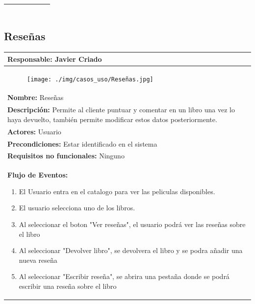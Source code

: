 \documentclass{report}
\begin{document}
\begin{center}
\begin{longtable}{|p{\linewidth}|}
\begin{figure}[H]
                    \end{figure}\\
                    \hline
                \end{longtable}
            \end{center}
        \clearpage

        \subsection{Reseñas}
        \begin{center}
            \begin{longtable}{|p{\linewidth}|}
                \hline
                \textbf{Responsable:} Javier Criado\\
                \hline
                \begin{figure}[H]
                    \centering
                    \texttt{[image: ./img/casos\_uso/Reseñas.jpg]}
                \end{figure}\\
                \hline
                \textbf{Nombre:} Reseñas\\
                \hline
                \textbf{Descripción:} Permite al cliente puntuar y comentar en un libro una vez lo haya devuelto, también permite modificar estos datos posteriormente.\\
                \hline
                \textbf{Actores:} Usuario\\
                \hline
                \textbf{Precondiciones:} Estar identificado en el sistema\\
                \hline
                \textbf{Requisitos no funcionales:} Ninguno\\
                \hline
                \textbf{Flujo de Eventos:}
                \begin{enumerate}
                    \item El Usuario entra en el catalogo para ver las peliculas disponibles.
                    \item El usuario selecciona uno de los libros.
                    \item Al seleccionar el boton "Ver reseñas", el usuario podrá ver las reseñas sobre el libro
                    \item Al seleccionar "Devolver libro", se devolvera el libro y se podra añadir una nueva reseña
                    \item Al seleccionar "Escribir reseña", se abrira una pestaña donde se podrá escribir una reseña sobre el libro  

\end{enumerate}
\end{longtable}
\end{center}
\end{document}
